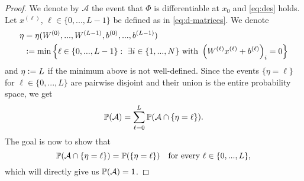 \begin{proof}
We denote by $\mathcal{A}$ the event that $\Phi$ is differentiable at $x_0$ and \eqref{eq:des} holds. 
Let $x^{(\ell)}$, $\ell \in \{0,...,L-1\}$ be defined as in \eqref{eq:d-matrices}.
We denote
\begin{align*}
\eta &= \eta (W^{(0)},..., W^{(L-1)}, b^{(0)},..., b^{(L-1)}) \\
&\mathrel{\mathop:}= \min \left\{\ell \in \{0,...,L-1\}: \ \exists i \in \{1,...,N\} \text{ with } \left(W^{(\ell)}x^{(\ell)} + b^{(\ell)}\right)_i = 0\right\}
\end{align*}
and $\eta \mathrel{\mathop:}= L$ if the minimum above is not well-defined. 
Since the events $\{\eta = \ell\}$ for $\ell \in \{0,...,L\}$ are pairwise disjoint and their union is the entire probability space, we get
\begin{equation*}
\mathbb{P}(\mathcal{A}) = \sum_{\ell = 0}^L \mathbb{P}(\mathcal{A} \cap \{\eta = \ell\}).
\end{equation*}
The goal is now to show that
\begin{equation}\label{eq:Ptoshow}
\mathbb{P} (\mathcal{A} \cap \{\eta = \ell\}) = \mathbb{P}(\{\eta = \ell\}) \quad \text{for every } \ell \in \{0,...,L\}, 
\end{equation}
which will directly give us $\mathbb{P}(\mathcal{A}) = 1$.


\end{proof}
